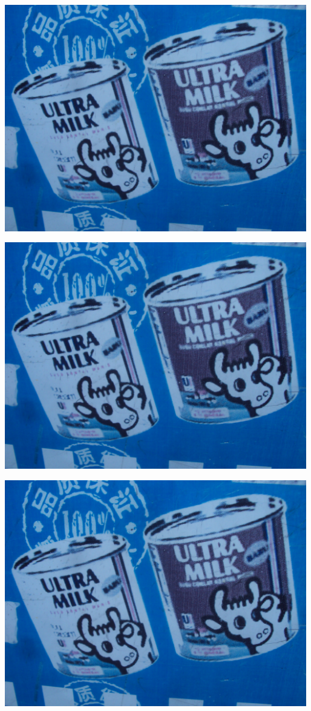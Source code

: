 \documentclass[10pt,letterpaper]{article}
\begin{document}
\includegraphics[width=5.19in]{landscape.jpg}

\vspace{0.25in}
\includegraphics[width=5.19in]{landscape.jpg}
\pagebreak

\includegraphics[width=5.19in]{landscape.jpg}
\pagebreak
\end{document}
